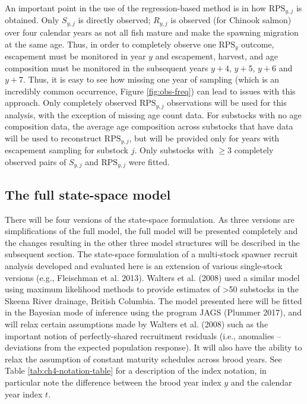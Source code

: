 \documentclass[12pt,]{book}
\theoremstyle{definition}
\theoremstyle{definition}
\theoremstyle{definition}
\theoremstyle{remark}
\begin{document}
An important point in the use of the regression-based method is in how
\(\text{RPS}_{y,j}\) is obtained. Only \(S_{y,j}\) is directly observed;
\(R_{y,j}\) is observed (for Chinook salmon) over four calendar years as
not all fish mature and make the spawning migration at the same age.
Thus, in order to completely observe one \(\text{RPS}_y\) outcome,
escapement must be monitored in year \(y\) and escapement, harvest, and
age composition must be monitored in the subsequent years \(y + 4\),
\(y + 5\), \(y + 6\) and \(y + 7\). Thus, it is easy to see how missing
one year of sampling (which is an incredibly common occurrence, Figure
\ref{fig:obs-freq}) can lead to issues with this approach. Only
completely observed \(\text{RPS}_{y,j}\) observations will be used for
this analysis, with the exception of missing age count data. For
substocks with no age composition data, the average age composition
across substocks that have data will be used to reconstruct
\(\text{RPS}_{y,j}\), but will be provided only for years with
escapement sampling for substock \(j\). Only substocks with \(\ge3\)
completely observed pairs of \(S_{y,j}\) and \(\text{RPS}_{y,j}\) were
fitted.

\subsection{The full state-space
model}\label{the-full-state-space-model}

\noindent
There will be four versions of the state-space formulation. As three
versions are simplifications of the full model, the full model will be
presented completely and the changes resulting in the other three model
structures will be described in the subsequent section. The state-space
formulation of a multi-stock spawner recruit analysis developed and
evaluated here is an extension of various single-stock versions (e.g.,
Fleischman et al. 2013). Walters et al. (2008) used a similar model
using maximum likelihood methods to provide estimates of
\textgreater{}50 substocks in the Skeena River drainage, British
Columbia. The model presented here will be fitted in the Bayesian mode
of inference using the program JAGS (Plummer 2017), and will relax
certain assumptions made by Walters et al. (2008) such as the important
notion of perfectly-shared recruitment residuals (i.e., anomalies --
deviations from the expected population response). It will also have the
ability to relax the assumption of constant maturity schedules across
brood years. See Table \ref{tab:ch4-notation-table} for a description of
the index notation, in particular note the difference between the brood
year index \(y\) and the calendar year index \(t\).
\end{document}
